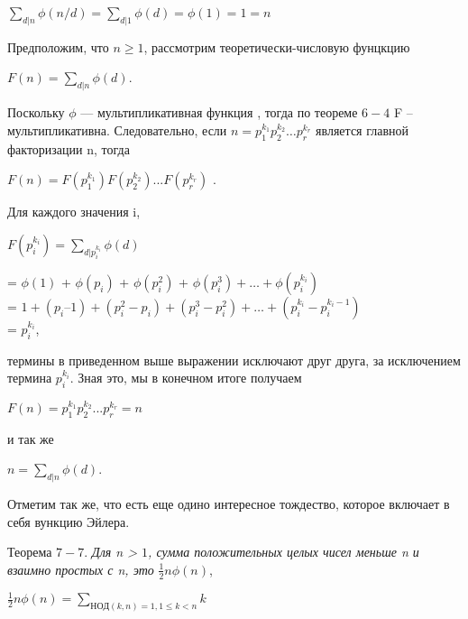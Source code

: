 \documentclass[12pt]{article}
\begin{document}
	\begin{center}
		$\sum_{d|n}\phi(n/d) = \sum_{d|1}\phi(d) = \phi(1) = 1 = \textit{n}$	
	\end{center}
	
	
	Предположим, что $n \geq 1$, рассмотрим теоретически-числовую фунцкцию
	
	\begin{center}
		$F(n) = \sum_{d|n}\phi(d)$.	
	\end{center}
	
	
	Поскольку $\phi$ — мультипликативная функция , тогда по теореме $6-4$ F – мультипликативна. Следовательно, если $n = p_1^{k_{1}}p_2^{k_{2}} … p_r^{k_{r}}$  является главной факторизации n, тогда 
	
	\begin{center}
		$F(n) = F(p_1^{k_{1}})F(p_2^{k_{2}})...F(p_r^{k_{r}})$ .	
	\end{center}
	
	
	Для каждого значения i,
	
	$F(p_i^{k_{i}}) =  \sum_{d|p_i^{k_{i}}}\phi(d)$	
	
	\begin{center}
		= $\phi(1)$ + $\phi(p_i)$ + $\phi(p_i^2)$ + $\phi(p_i^3)+ … + \phi(p_i^{k_{i}})$ \\
		= $1 + (p_i – 1) + (p_i^2  - p_i) + (p_i^3  - p_i^2 ) + … + (p_i^{k_{i}}  - p_i^{k_{i} - 1})$ \\
		= $p_i^{k_{i}}$,	
	\end{center}
	
	
	термины в приведенном выше выражении исключают друг друга, за исключением термина  $p_i^{k_{i}}$. Зная это, мы в конечном итоге получаем
	
	\begin{center}
		$F(n) = p_1^{k_{1}}p_2^{k_{2}}...p_r^{k_{r}} = \textit{n}$	
	\end{center}
	
	
	и так же 
	
	\begin{center}
		$n = \sum_{d|n}\phi(d)$.	
	\end{center}
	
	
	Отметим так же, что есть еще одино интересное тождество, которое включает в себя вункцию Эйлера.
	
	Теорема $7-7$. \textit{Для  n > $1$, сумма положительных целых чисел меньше n и взаимно простых с n, это} $\frac{1}{2}n\phi(n)$,
	
	\begin{center}
		$\frac{1}{2}n\phi(n) = 
		\sum_{НОД(k, n) = 1, 1 \leq k < n}k$	
	\end{center}
	
\end{document}
